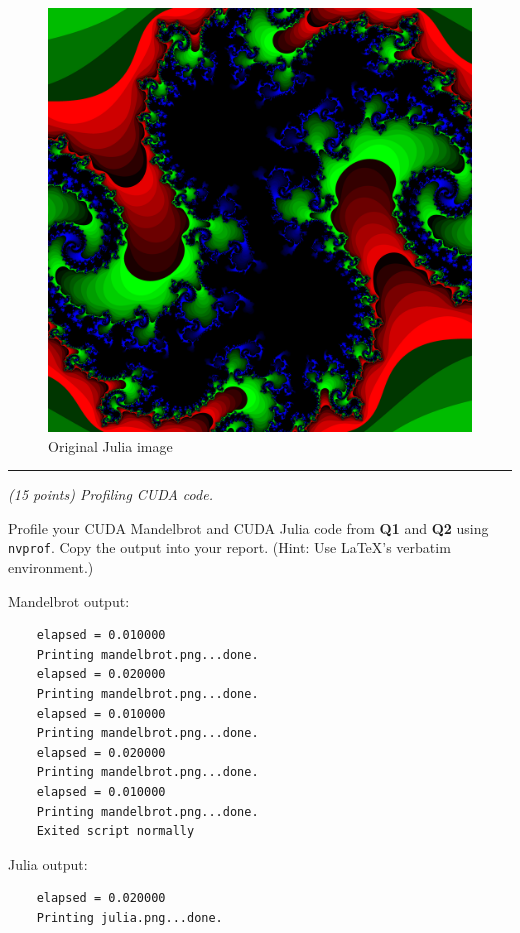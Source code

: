 \documentclass{article}
\newcommand{\myhrule}{ \begin{center}\rule{.9\linewidth}{.25mm}\end{center} }
\newcommand{\pad}{\vspace{8pt}\noindent}
\begin{document}
\begin{figure}[h!]
    \centering
    \includegraphics[scale=0.05]{julia.png}
    \caption{Original Julia image}
    \label{fig:julia}
\end{figure}

\newpage

\myhrule
\pad {\bf Q3} {\it (15 points) Profiling CUDA code.}
\vspace{8pt} 

\noindent Profile your CUDA Mandelbrot and CUDA Julia code from \textbf{Q1} and \textbf{Q2} using \texttt{nvprof}. Copy the output into your report. (Hint: Use \LaTeX{}'s verbatim environment.)

Mandelbrot output:
\begin{verbatim}
    elapsed = 0.010000
    Printing mandelbrot.png...done.
    elapsed = 0.020000
    Printing mandelbrot.png...done.
    elapsed = 0.010000
    Printing mandelbrot.png...done.
    elapsed = 0.020000
    Printing mandelbrot.png...done.
    elapsed = 0.010000
    Printing mandelbrot.png...done.
    Exited script normally
\end{verbatim}

Julia output:
\begin{verbatim}
    elapsed = 0.020000
    Printing julia.png...done.
\end{verbatim}
\end{document}
